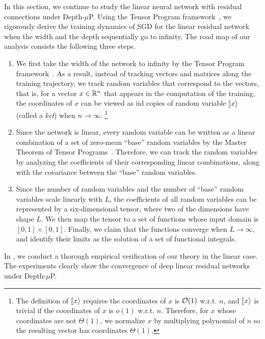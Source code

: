 \documentclass{article}
\theoremstyle{plain}
\theoremstyle{definition}
\begin{document}
In this section, we continue to study the linear neural network with residual connections under Depth-$\mu$P. Using the Tensor Program framework~\citep{yang2023tensor}, we rigorously derive the training dynamics of SGD for the linear residual network when the width and the depth sequentially go to infinity.  The road map of our analysis consists the following three steps.
\begin{enumerate}
    \item We first take the width of the network to infinity by the Tensor Program framework~\cite{yang2023tensor}. As a result, instead of tracking vectors and matrices along the training trajectory, we track random variables that correspond to the vectors, that is, for a vector $x\in \mathbb{R}^n$ that appears in the computation of the training, the coordinates of $x$ can be viewed as iid copies of random variable $\ket x$ (called a \emph{ket}) when $n\to\infty$. \footnote{The definition of $\ket x$ requires the coordinates of $x$ is $\mathcal{O}(1)$ w.r.t. $n$, and $\ket x$ is trivial if the coordinates of $x$ is $o(1)$ w.r.t. $n$. Therefore, for $x$ whose coordinates are not $\Theta(1)$, we normalize $x$ by multiplying polynomial of $n$ so the resulting vector has coordinates $\Theta(1)$. } 
    \item Since the network is linear, every random variable can be written as a linear combination of a set of zero-mean ``base'' random variables by the Master Theorem of Tensor Programs~\cite{yang2023tensor}. Therefore, we can track the random variables by analyzing the coefficients of their corresponding linear combinations, along with the covariance between the ``base'' random variables.
    \item Since the number of random variables and the number of ``base'' random variables scale linearly with $L$, the coefficients of all random variables can be represented by a six-dimensional tensor, where two of the dimensions have shape $L$. We  then map the tensor to a set of functions whose input domain is $[0,1]\times [0,1]$. Finally, we claim that the functions converge when $L\to\infty$, and identify their limits as the solution of a set of functional integrals.
\end{enumerate}
In , we conduct a thorough empirical verification of our theory in the linear case. The experiments clearly show the convergence of deep linear residual networks under Depth-$\mu$P. 
\end{document}
